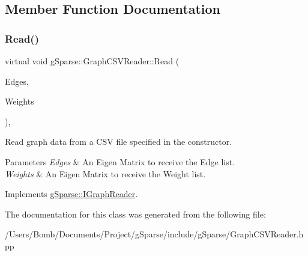\subsection{Member Function Documentation}
\mbox{\label{classg_sparse_1_1_graph_c_s_v_reader_a01218efe45c694d0b721e737e9c53365}} 
\subsubsection{\texorpdfstring{Read()}{Read()}}
{\footnotesize\ttfamily virtual void g\+Sparse\+::\+Graph\+C\+S\+V\+Reader\+::\+Read (\begin{DoxyParamCaption}\item[{g\+Sparse\+::\+Edge\+Matrix \&}]{Edges,  }\item[{g\+Sparse\+::\+Precision\+Row\+Matrix \&}]{Weights }\end{DoxyParamCaption})\hspace{0.3cm}{\ttfamily [inline]}, {\ttfamily [virtual]}}



Read graph data from a C\+SV file specified in the constructor. 


\begin{DoxyParams}{Parameters}
{\em Edges} & An Eigen Matrix to receive the Edge list. \\
\hline
{\em Weights} & An Eigen Matrix to receive the Weight list. \\
\hline
\end{DoxyParams}


Implements \mbox{\hyperlink{classg_sparse_1_1_i_graph_reader_a42885505f5bdb8136b0d5b386925d1c7}{g\+Sparse\+::\+I\+Graph\+Reader}}.



The documentation for this class was generated from the following file\+:\begin{DoxyCompactItemize}
\item 
/\+Users/\+Bomb/\+Documents/\+Project/g\+Sparse/include/g\+Sparse/Graph\+C\+S\+V\+Reader.\+hpp\end{DoxyCompactItemize}
